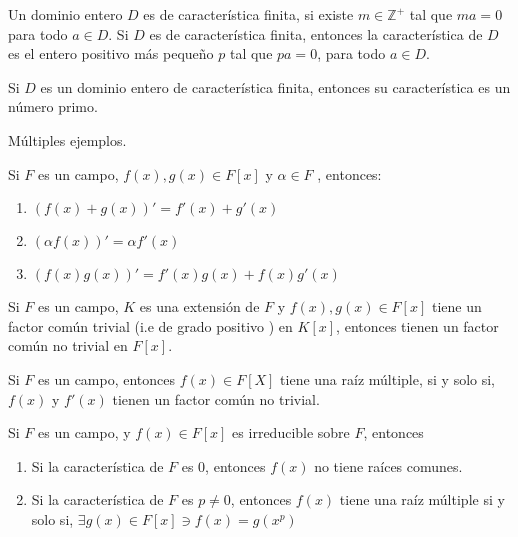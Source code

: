 \begin{definicion}
    Un dominio entero $D$ es de característica finita, si existe $m\in \mathbb{Z}^+$ tal que $ma=0$ para todo $a\in D$. Si $D$ es de característica finita, entonces la característica de $D$ es el entero positivo más pequeño $p$ tal que $pa=0$, para todo $a\in D$.
\end{definicion}

\begin{prop}
    Si $D$ es un dominio entero de característica finita, entonces su característica es un número primo. 
\end{prop}

\begin{ejemplo}
    Múltiples ejemplos.
\end{ejemplo}

\begin{lema}[5.5]
    Si $F$ es un campo, $f(x),g(x)\in F[x]$ y $\alpha\in F$ , entonces: 
    \begin{enumerate}
        \item $(f(x)+g(x))'=f'(x)+g'(x)$
        \item $(\alpha f(x))'=\alpha f'(x)$
        \item $(f(x)g(x))'=f'(x)g(x)+f(x)g'(x)$
    \end{enumerate}
\end{lema}
\begin{lema}[5.5]
    Si $F$ es un campo, $K$ es una extensión de $F$ y $f(x),g(x)\in F[x]$ tiene un factor común trivial (i.e de grado positivo ) en $K[x]$, entonces tienen un factor común no trivial en $F[x]$. 
\end{lema}
\begin{lema}[5.6]
    Si $F$ es un campo, entonces $f(x)\in F[X]$ tiene una raíz múltiple, si y solo si, $f(x)$ y $f'(x)$ tienen un factor común no trivial. 
\end{lema}

\begin{corolario}
    Si $F$ es un campo, y $f(x)\in F[x]$ es irreducible sobre $F$, entonces
    \begin{enumerate}
        \item Si la característica de $F$ es 0, entonces $f(x)$ no tiene raíces comunes. 
        \item Si la característica de $F$ es $p\neq 0$, entonces $f(x)$ tiene una raíz múltiple si y solo si, $\exists g(x)\in F[x]\ni f(x)=g(x^p)$
    \end{enumerate}
\end{corolario}

